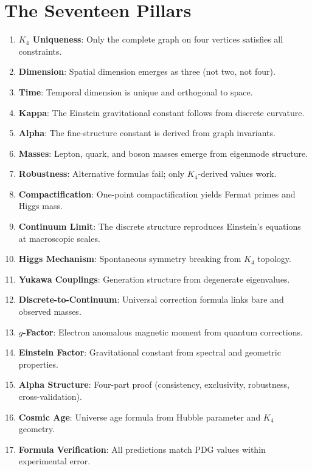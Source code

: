 \documentclass[11pt,a4paper]{book}
\begin{document}
\section{The Seventeen Pillars}

\begin{enumerate}
\item \textbf{$K_4$ Uniqueness}: Only the complete graph on four vertices satisfies all constraints.
\item \textbf{Dimension}: Spatial dimension emerges as three (not two, not four).
\item \textbf{Time}: Temporal dimension is unique and orthogonal to space.
\item \textbf{Kappa}: The Einstein gravitational constant follows from discrete curvature.
\item \textbf{Alpha}: The fine-structure constant is derived from graph invariants.
\item \textbf{Masses}: Lepton, quark, and boson masses emerge from eigenmode structure.
\item \textbf{Robustness}: Alternative formulas fail; only $K_4$-derived values work.
\item \textbf{Compactification}: One-point compactification yields Fermat primes and Higgs mass.
\item \textbf{Continuum Limit}: The discrete structure reproduces Einstein's equations at macroscopic scales.
\item \textbf{Higgs Mechanism}: Spontaneous symmetry breaking from $K_4$ topology.
\item \textbf{Yukawa Couplings}: Generation structure from degenerate eigenvalues.
\item \textbf{Discrete-to-Continuum}: Universal correction formula links bare and observed masses.
\item \textbf{$g$-Factor}: Electron anomalous magnetic moment from quantum corrections.
\item \textbf{Einstein Factor}: Gravitational constant from spectral and geometric properties.
\item \textbf{Alpha Structure}: Four-part proof (consistency, exclusivity, robustness, cross-validation).
\item \textbf{Cosmic Age}: Universe age formula from Hubble parameter and $K_4$ geometry.
\item \textbf{Formula Verification}: All predictions match PDG values within experimental error.
\end{enumerate}
\end{document}

